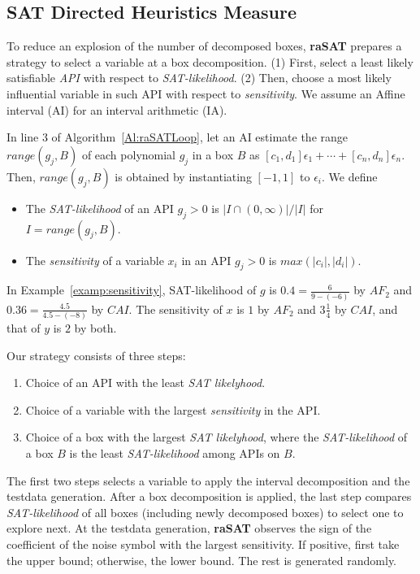 \documentclass[runningheads,a4paper,oribibl]{llncs}
\newcommand{\suppress}[1]{} %
\begin{document}
\subsection{SAT Directed Heuristics Measure} \label{sec:SATheuristics}

\suppress{
With several hundred variables, we observe that an SMT solver works
when either SAT, or UNSAT with small UNSAT core.
%
For the latter, we need an efficient heuristics to find an UNSAT core, which is left as future work. 
For the former, the keys are how to choose variables to decompose, and 
how to choose a box to explore.
}%

To reduce an explosion of the number of decomposed boxes, {\bf raSAT} prepares a strategy
to select a variable at a box decomposition. 
(1) First, select a least likely satisfiable {\em API} with respect to {\em SAT-likelihood}.
(2) Then, choose a most likely influential variable in such API with respect to
{\em sensitivity}.
We assume an Affine interval (AI) for an interval arithmetic (IA). 

\sloppy
In line 3 of Algorithm~\ref{Al:raSATLoop},
let an AI estimate the range $range(g_j, B)$ of each polynomial $g_j$ in a box $B$
as ${[c_1,d_1]\epsilon_1 + \cdots + [c_n,d_n]\epsilon_n}$. 
Then, $range(g_j, B)$ is obtained by instantiating $[-1,1]$ to $\epsilon_i$. 
We define
\begin{itemize} 
\item The {\em SAT-likelihood} of an API $g_j > 0$ is $| I \cap (0,\infty) | / |I|$
  for  $I = range(g_j, B)$. 
\item The {\em sensitivity} of a variable $x_i$ in an API $g_j > 0$ is $max(|c_i|, |d_i|)$. 
\end{itemize} 

\begin{example} \label{examp:SATlikelihood}
  In Example~\ref{examp:sensitivity},
  SAT-likelihood of $g$ is $0.4= \frac{6}{9-(-6)}$ by $AF_2$ 
  and $0.36 = \frac{4.5}{4.5-(-8)}$ by $CAI$.
  The sensitivity of $x$ is $1$ by $AF_2$ and $3\frac{1}{4}$ by $CAI$,
  and that of $y$ is $2$ by both.
\end{example}

Our strategy consists of three steps:
\begin{enumerate}
\item Choice of an API with the least {\em SAT likelyhood}.
\item Choice of a variable with the largest {\em sensitivity} in the API.
\item Choice of a box with the largest {\em SAT likelyhood}, where
the {\em SAT-likelihood} of a box $B$ is the least {\em SAT-likelihood} among APIs on $B$.
\end{enumerate}
The first two steps selects a variable to apply the interval decomposition and
the testdata generation. After a box decomposition is applied, the last step
compares {\em SAT-likelihood} of all boxes (including newly decomposed boxes)
to select one to explore next. 
%
At the testdata generation, 
{\bf raSAT} observes the sign of the coefficient of the noise symbol with the largest
sensitivity. 
If positive, first take the upper bound; %
otherwise, the lower bound. The rest is generated randomly. 
\end{document}

